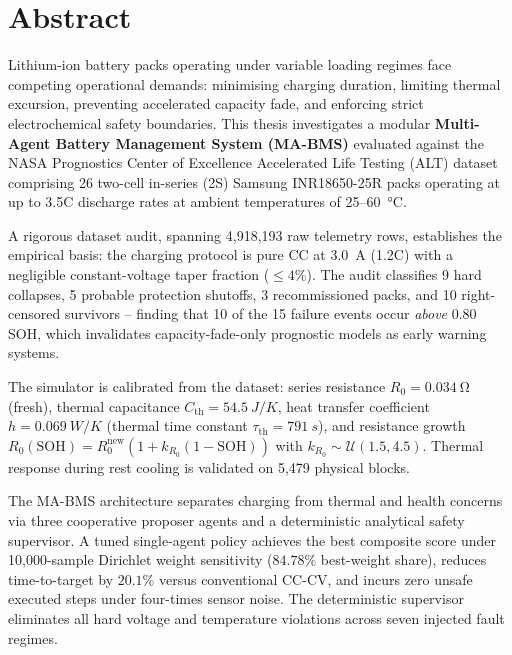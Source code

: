 \documentclass[a4paper, 12pt]{report}
\theoremstyle{definition}
\begin{document}
\chapter*{Abstract}

Lithium-ion battery packs operating under variable loading regimes
face competing operational demands: minimising charging duration,
limiting thermal excursion, preventing accelerated capacity fade, and
enforcing strict electrochemical safety boundaries. This thesis
investigates a modular \textbf{Multi-Agent Battery Management System
(MA-BMS)} evaluated against the NASA Prognostics Center of Excellence
Accelerated Life Testing (ALT) dataset comprising 26 two-cell
in-series (2S) Samsung INR18650-25R packs operating at up to 3.5C
discharge rates at ambient temperatures of 25--\SI{60}{\degreeCelsius}.

A rigorous dataset audit, spanning 4{,}918{,}193 raw telemetry
rows, establishes the empirical basis: the charging protocol is pure
CC at \SI{3.0}{A} (1.2C) with a negligible constant-voltage taper
fraction ($\leq 4\%$). The audit classifies 9 hard collapses, 5
probable protection shutoffs, 3 recommissioned packs, and 10
right-censored survivors -- finding that 10 of the 15 failure events
occur \emph{above} 0.80 SOH, which invalidates capacity-fade-only
prognostic models as early warning systems.

The simulator is calibrated from the dataset: series resistance
$R_0 = \SI{0.034}{\ohm}$ (fresh), thermal capacitance
$C_{\mathrm{th}} = \SI{54.5}{J/K}$, heat transfer coefficient
$h = \SI{0.069}{W/K}$ (thermal time constant $\tau_{\mathrm{th}} =
\SI{791}{s}$), and resistance growth $R_0(\mathrm{SOH}) = R_0^{\mathrm{new}}
(1 + k_{R_0}(1-\mathrm{SOH}))$ with $k_{R_0} \sim \mathcal{U}(1.5,
4.5)$. Thermal response during rest cooling is validated on 5{,}479
physical blocks.

The MA-BMS architecture separates charging from thermal and health
concerns via three cooperative proposer agents and a deterministic
analytical safety supervisor. A tuned single-agent policy achieves
the best composite score under 10{,}000-sample Dirichlet
weight sensitivity ($84.78\%$ best-weight share), reduces
time-to-target by $20.1\%$ versus conventional CC-CV, and incurs
zero unsafe executed steps under four-times sensor noise. The
deterministic supervisor eliminates all hard voltage and temperature
violations across seven injected fault regimes.
\end{document}
